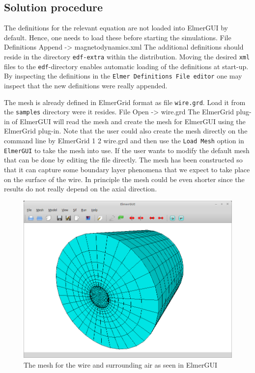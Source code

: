\subsection*{Solution procedure}

The definitions for the relevant equation are not loaded into ElmerGUI by default. Hence, 
one needs to load these before starting the simulations.
\ttbegin
File 
  Definitions
    Append -> magnetodynamics.xml
\ttend
The additional definitions should reside in the directory \texttt{edf-extra} within the distribution.
Moving the desired \texttt{xml} files to the \texttt{edf}-directory enables automatic loading of the 
definitions at start-up. By inspecting the definitions in the \texttt{Elmer Definitions File editor} one
may inspect that the new definitions were really appended. 

The mesh is already defined in ElmerGrid format as file \texttt{wire.grd}. Load it from the \texttt{samples} directory were it resides.
\ttbegin
File 
  Open -> wire.grd
\ttend
The ElmerGrid plug-in of ElmerGUI will read the mesh and create the mesh for ElmerGUI using the ElmerGrid plug-in.
Note that the user
could also create the mesh directly on the command line by
\ttbegin
ElmerGrid 1 2 wire.grd
\ttend
and then use the \texttt{Load Mesh} option in \texttt{ElmerGUI} to take the mesh into use. 
If the user wants to modify the default mesh that can be done by editing the file directly.
The mesh has been constructed so that it can capture some boundary layer phenomena that we expect to take
place on the surface of the wire. In principle the mesh could be even shorter since the results do not really
depend on the axial direction. 


\begin{figure}[h]
\centering
\includegraphics[width=140mm]{WireElmerGUI}
\caption{The mesh for the wire and surrounding air as seen in ElmerGUI}\label{fg:WireElmerGUI}
\end{figure}  


